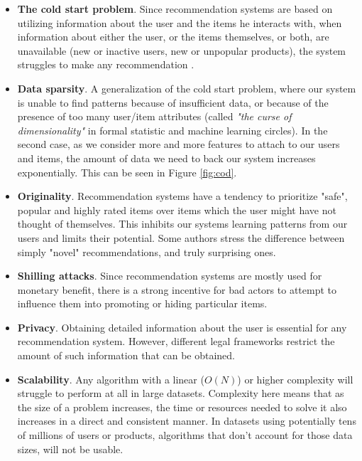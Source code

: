 \documentclass[12pt, a4paper]{article}
\begin{document}
\begin{itemize}
    \item \textbf{The cold start problem}. Since recommendation systems are based on utilizing information about the user and the items he interacts with, when information about either the user, or the items themselves, or both, are unavailable (new or inactive users, new or unpopular products), the system struggles to make any recommendation \cite{cold-start}.

    \item \textbf{Data sparsity}. A generalization of the cold start problem, where our system is unable to find patterns because of insufficient data, or because of the presence of too many user/item attributes (called \textit{"the curse of dimensionality"} in formal statistic and machine learning circles). In the second case, as we consider more and more features to attach to our users and items, the amount of data we need to back our system increases exponentially. This can be seen in Figure \ref{fig:cod}.

    \item \textbf{Originality}. Recommendation systems have a tendency to prioritize "safe", popular and highly rated items over items which the user might have not thought of themselves. This inhibits our systems learning patterns from our users and limits their potential. Some authors \cite{survey2} stress the difference between simply "novel" recommendations, and truly surprising ones.

    \item \textbf{Shilling attacks}. Since recommendation systems are mostly used for monetary benefit, there is a strong incentive for bad actors to attempt to influence them into promoting or hiding particular items.

    \item \textbf{Privacy}. Obtaining detailed information about the user is essential for any recommendation system. However, different legal frameworks restrict the amount of such information that can be obtained.

    \item \textbf{Scalability}. Any algorithm with a linear ($O(N)$) or higher complexity will struggle to perform at all in large datasets. Complexity here means that as the size of a problem increases, the time or resources needed to solve it also increases in a direct and consistent manner. In datasets using potentially tens of millions of users or products, algorithms that don't account for those data sizes, will not be usable.

\end{itemize}
\end{document}
